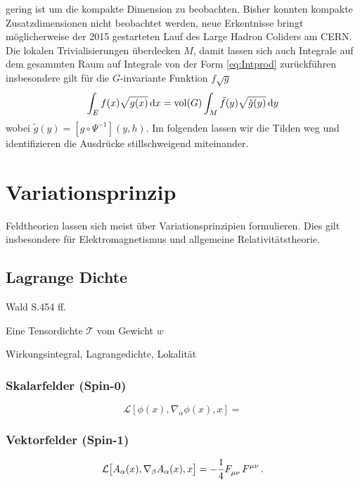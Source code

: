gering ist um die kompakte Dimension zu beobachten. Bisher konnten kompakte
Zusatzdimensionen nicht beobachtet werden, neue Erkentnisse bringt
möglicherweise der 2015 gestarteten Lauf des Large Hadron Coliders am CERN. Die
lokalen Trivialisierungen überdecken $M$, damit lassen sich auch Integrale auf dem gesammten Raum auf
Integrale von der Form \eqref{eq:Intprod} zurückführen insbesondere gilt für die 
 $G$-invariante Funktion $f\sqrt{g}$ 
\begin{equation}
\int_{E}f(x)\sqrt{g(x)}\dif x=\vol
(G)\int_{M}\tilde{f}\left(y\right)\sqrt{\tilde{g}(y)}\dif y
\end{equation}
wobei $\tilde{g}(y)=\left[g\circ\Psi^{-1}\right](y,h)$. Im folgenden lassen wir
die Tilden weg und identifizieren die Ausdrücke stillschweigend miteinander.
\section{Variationsprinzip}
Feldtheorien lassen sich meist über 
Variationsprinzipien formulieren. Dies gilt insbesondere für
Elektromagnetismus und allgemeine Relativitätstheorie.
\subsection{Lagrange Dichte}
Wald\cite{wald2010general} S.454 ff.
\begin{definition}[Tensordichte]
Eine Tensordichte $\mathcal{T}$ vom Gewicht $w$
\end{definition}
Wirkungsintegral, Lagrangedichte, Lokalität
\begin{beispiel}
\end{beispiel}
\begin{definition}[Variationsableitung]
\end{definition}
\subsubsection{Skalarfelder (Spin-0)}
\begin{equation}
\mathcal{L}\left[\phi(x),\nabla_\alpha\phi(x),x\right]=
\end{equation}
\subsubsection{Vektorfelder (Spin-1)}
\begin{equation}
\mathcal{L}\left[A_\alpha(x),\nabla_\beta
A_\alpha(x),x\right]=-\frac{1}{4}\tensor{F}{_\mu_\nu}\tensor{F}{^\mu^\nu}\,.
\end{equation}

